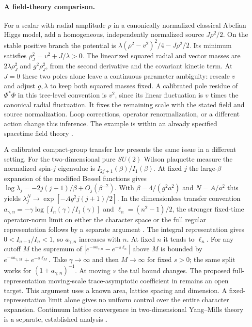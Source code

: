 \documentclass[11pt,letterpaper]{article}
\begin{document}
\paragraph{A field-theory comparison.}
For a scalar with radial amplitude $\rho$ in a canonically normalized classical Abelian Higgs model, add a homogeneous, independently normalized source $J\rho^2/2$. On the stable positive branch the potential is $\lambda(\rho^2-v^2)^2/4-J\rho^2/2$. Its minimum satisfies $\rho_J^2=v^2+J/\lambda>0$. The linearized squared radial and vector masses are $2\lambda\rho_J^2$ and $g^2\rho_J^2$, from the second derivative and the covariant kinetic term. At $J=0$ these two poles alone leave a continuous parameter ambiguity: rescale $v$ and adjust $g,\lambda$ to keep both squared masses fixed. A calibrated pole residue of $\Phi^*\Phi$ in this tree-level convention is $v^2$, since its linear fluctuation is $v$ times the canonical radial fluctuation. It fixes the remaining scale with the stated field and source normalization. Loop corrections, operator renormalization, or a different action change this inference. The example is within an already specified spacetime field theory \cite{higgs}.

A calibrated compact-group transfer law presents the same issue in a different setting. For the two-dimensional pure $SU(2)$ Wilson plaquette measure the normalized spin-$j$ eigenvalue is $I_{2j+1}(\beta)/I_1(\beta)$. At fixed $j$ the large-$\beta$ expansion of the modified Bessel functions gives $\log\lambda_j=-2j(j+1)/\beta+O_j(\beta^{-2})$. With $\beta=4/(g^2a^2)$ and $N=A/a^2$ this yields $\lambda_j^N\to\exp[-Ag^2 j(j+1)/2]$. In the dimensionless transfer convention $a_{\gamma,n}=-\gamma\log[I_n(\gamma)/I_1(\gamma)]$ and $\ell_n=(n^2-1)/2$, the stronger fixed-time operator-norm limit on either the character space or the full regular representation follows by a separate argument \cite{compact}. The integral representation gives $0<I_{n+1}/I_n<1$, so $a_{\gamma,n}$ increases with $n$. At fixed $n$ it tends to $\ell_n$. For any cutoff $M$ the supremum of $|e^{-s a_{\gamma,n}}-e^{-s\ell_n}|$ above $M$ is bounded by $e^{-s a_{\gamma,M}}+e^{-s\ell_M}$. Take $\gamma\to\infty$ and then $M\to\infty$ for fixed $s>0$; the same split works for $(1+a_{\gamma,n})^{-1}$. At moving $s$ the tail bound changes. The proposed full-representation moving-scale trace-asymptotic coefficient in \cite{compact} remains an open target. This argument uses a known area, lattice spacing and dimension. A fixed-representation limit alone gives no uniform control over the entire character expansion. Continuum lattice convergence in two-dimensional Yang–Mills theory is a separate, established analysis \cite{driver}.
\end{document}
